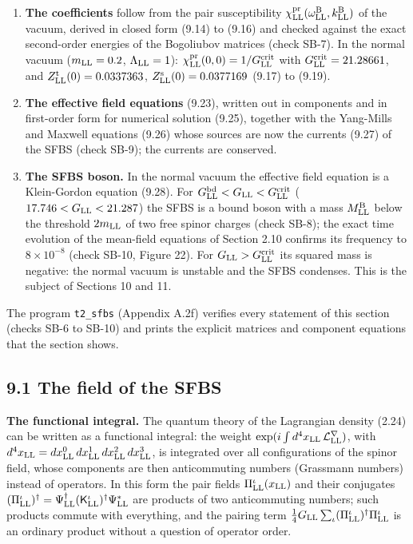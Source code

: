 \documentclass[
  10pt,
]{article}
\begin{document}
\begin{enumerate}
  the Lagrangian of a charged scalar field, the analogue of the Higgs
  field.
\item
  \textbf{The coefficients} follow from the pair susceptibility
  \(\chi^{\rm pr}_{\rm LL}(\omega^{\rm B}_{\rm LL},k^{\rm B}_{\rm LL})\)
  of the vacuum, derived in closed form (9.14) to (9.16) and checked
  against the exact second-order energies of the Bogoliubov matrices
  (check SB-7). In the normal vacuum (\(m_{\rm LL}=0.2\),
  \(\Lambda_{\rm LL}=1\)):
  \(\chi^{\rm pr}_{\rm LL}(0,0)=1/G^{\rm crit}_{\rm LL}\) with
  \(G^{\rm crit}_{\rm LL}=21.28661\), and
  \(Z^{\rm t}_{\rm LL}(0)=0.0337363\),
  \(Z^{\rm s}_{\rm LL}(0)=0.0377169\) (9.17) to (9.19).
\item
  \textbf{The effective field equations} (9.23), written out in
  components and in first-order form for numerical solution (9.25),
  together with the Yang-Mills and Maxwell equations (9.26) whose
  sources are now the currents (9.27) of the SFBS (check SB-9); the
  currents are conserved.
\item
  \textbf{The SFBS boson.} In the normal vacuum the effective field
  equation is a Klein-Gordon equation (9.28). For
  \(G^{\rm bd}_{\rm LL}<G_{\rm LL}<G^{\rm crit}_{\rm LL}\)
  (\(17.746<G_{\rm LL}<21.287\)) the SFBS is a bound boson with a mass
  \(M^{\rm B}_{\rm LL}\) below the threshold \(2m_{\rm LL}\) of two free
  spinor charges (check SB-8); the exact time evolution of the
  mean-field equations of Section 2.10 confirms its frequency to
  \(8\times10^{-8}\) (check SB-10, Figure 22). For
  \(G_{\rm LL}>G^{\rm crit}_{\rm LL}\) its squared mass is negative: the
  normal vacuum is unstable and the SFBS condenses. This is the subject
  of Sections 10 and 11.
\end{enumerate}

The program \texttt{t2\_sfbs} (Appendix A.2f) verifies every statement
of this section (checks SB-6 to SB-10) and prints the explicit matrices
and component equations that the section shows.

\hypertarget{the-field-of-the-sfbs}{%
\subsection{9.1 The field of the SFBS}\label{the-field-of-the-sfbs}}

\textbf{The functional integral.} The quantum theory of the Lagrangian
density (2.24) can be written as a functional integral: the weight
\(\exp(i\int d^4x_{\rm LL}\,\mathcal L^\nabla_{\rm LL})\), with
\(d^4x_{\rm LL}=dx^0_{\rm LL}\,dx^1_{\rm LL}\,dx^2_{\rm LL}\,dx^3_{\rm LL}\),
is integrated over all configurations of the spinor field, whose
components are then anticommuting numbers (Grassmann numbers) instead of
operators. In this form the pair fields
\(\Pi^\iota_{\rm LL}(x_{\rm LL})\) and their conjugates
\((\Pi^\iota_{\rm LL})^\dagger=\Psi^\dagger_{\rm LL}(\mathsf K^\iota_{\rm LL})^\dagger\Psi^*_{\rm LL}\)
are products of two anticommuting numbers; such products commute with
everything, and the pairing term
\(\tfrac14G_{\rm LL}\sum_\iota(\Pi^\iota_{\rm LL})^\dagger\Pi^\iota_{\rm LL}\)
is an ordinary product without a question of operator order.
\end{document}
